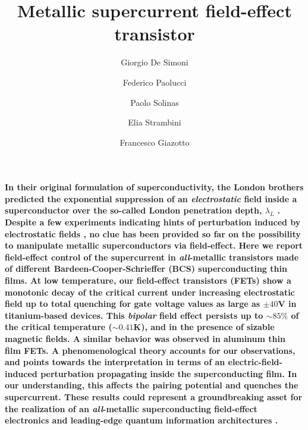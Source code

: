 \documentclass[prl,twocolumn,reprint,graphicx,showpacs,superscriptaddress,floatfix]{revtex4-1}
\begin{document}
\title{Metallic  supercurrent field-effect transistor}

\author{Giorgio De Simoni}
\author{Federico Paolucci}
\author{Paolo Solinas}
\author{Elia Strambini}
\author{Francesco Giazotto}


\maketitle


\textbf{In their original formulation of superconductivity, the London brothers predicted \cite{London1935} the exponential suppression of an \emph{electrostatic} field inside a superconductor over the so-called London penetration depth, $\lambda_L$ \cite{Hirsch1,Hirsch2,Tinkham}.
Despite a few experiments indicating hints of  perturbation induced by electrostatic fields \cite{Tao1,Glover1960,NbCluster}, no clue has been provided so far on the possibility to manipulate metallic superconductors via field-effect.
Here we report field-effect control of the supercurrent in \emph{all}-metallic transistors made of different Bardeen-Cooper-Schrieffer (BCS) superconducting thin films. 
At low temperature, our field-effect transistors (FETs) show a monotonic decay of the critical current under 
increasing electrostatic field up to total quenching for gate voltage values as large as $\pm 40$V in titanium-based devices. 
This \emph{bipolar} field effect 
persists up to $\sim 85\%$  of the critical temperature ($\sim 0.41$K), and in the presence of sizable magnetic fields. 
A similar behavior was observed in aluminum thin film FETs.
A phenomenological theory 
accounts for our observations, and points towards the interpretation in terms of 
an electric-field-induced perturbation propagating inside the superconducting film. In our understanding, this affects the pairing potential and  quenches the supercurrent. 
 These results could represent a groundbreaking asset for the realization of an \emph{all}-metallic superconducting  field-effect electronics and leading-edge quantum information architectures \cite{Marcus1,Marcus2}.
}
\end{document}
